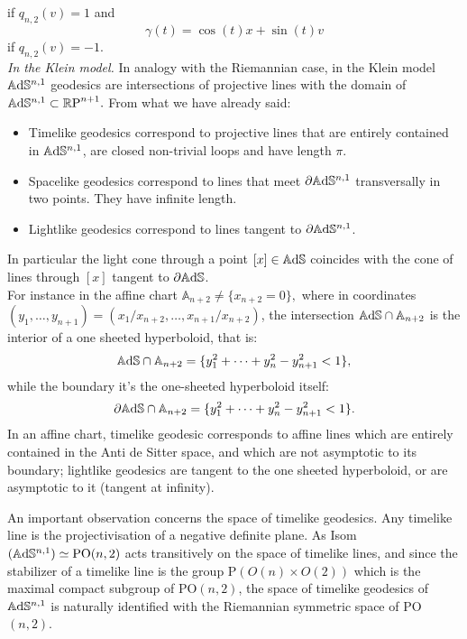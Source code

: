 if $q_{n,2}(v)=1$ and 
\begin{equation}\label{212}
    \gamma(t)=\cos(t)x+\sin(t)v
\end{equation}
if $q_{n,2}(v)=-1$.\\

\textit{In the Klein model.} In analogy with the Riemannian case, in the Klein model $\mathbb{A}\mathrm{d}\mathbb{S}^{n,1}$ geodesics are intersections of projective lines with the domain of $\mathbb{A}\mathrm{d}\mathbb{S}^{n,1}\subset\mathbb{R} \text{P}^{n+1}.$ From what we have already said: 
\begin{itemize}
    \item Timelike geodesics correspond to projective lines that are entirely contained in $\mathbb{A}\mathrm{d}\mathbb{S}^{n,1}$, are closed non-trivial loops and have length $\pi.$ 
    \item Spacelike geodesics correspond to lines that meet $\partial \mathbb{A}\mathrm{d}\mathbb{S}^{n,1}$ transversally in two points. They have infinite length.
    \item Lightlike geodesics correspond to lines tangent to $\partial\mathbb{A}\mathrm{d}\mathbb{S}^{n,1}$.   
\end{itemize}

In particular the light cone through a point $[x]\in \mathbb{A}\mathrm{d}\mathbb{S}$ coincides with the cone of lines through $[x]$ tangent to $\partial \mathbb{A}\mathrm{d}\mathbb{S}$.\\ For instance in the affine chart $\mathbb{A}_{n+2}\neq\{x_{n+2}=0\},$ where in coordinates $(y_1, \dots, y_{n+1})=(x_1/x_{n+2},\dots, x_{n+1}/x_{n+2})$, the intersection $\mathbb{A}\mathrm{d}\mathbb{S}\cap\mathbb{A}_{n+2}$ is the interior of a one sheeted hyperboloid, that is: 
\[
    \mathbb{A}\mathrm{d}\mathbb{S}\cap\mathbb{A}_{n+2}=\{y_1^2+\dots+y_n^2-y_{n+1}^2<1\},
\]
 while the boundary it's the one-sheeted hyperboloid itself: 
 \[
    \partial\mathbb{A}\mathrm{d}\mathbb{S}\cap\mathbb{A}_{n+2}=\{y_1^2+\dots+y_n^2-y_{n+1}^2<1\}.
\]
In an affine chart, timelike geodesic corresponds to affine lines which are entirely contained in the Anti de Sitter space, and which are not asymptotic to its boundary; lightlike geodesics are tangent to the one sheeted hyperboloid, or are asymptotic to it (tangent at infinity).

\begin{observation} An important observation concerns the space of timelike geodesics. Any timelike line is the projectivisation of a negative definite plane. As Isom$(\mathbb{A}\mathrm{d}\mathbb{S}^{n,1})\simeq \text{PO}(n,2)$ acts transitively on the space of timelike lines, and since the stabilizer of a timelike line is the group $\text{P}(O(n)\times O(2))$ which is the maximal compact subgroup of $\text{PO}(n,2)$, the space of timelike geodesics of $\mathbb{A}\mathrm{d}\mathbb{S}^{n,1}$ is naturally identified with the Riemannian symmetric space of PO$(n,2)$.
\end{observation}

